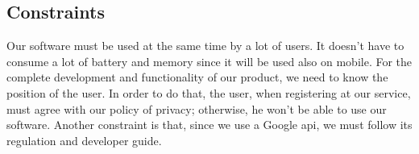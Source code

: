 
\subsection{Constraints} \label{subsec:constraints}
Our software must be used at the same time by a lot of users. It doesn't have to consume a lot of battery and memory since it will be used also on mobile. 
For the complete development and functionality of our product, we need to know the position of the user. In order to do that, the user, when registering at our service, must agree with our policy of privacy; otherwise, he won't be able to use our software.
Another constraint is that, since we use a Google \acs{api}, we must follow its regulation and developer guide.


